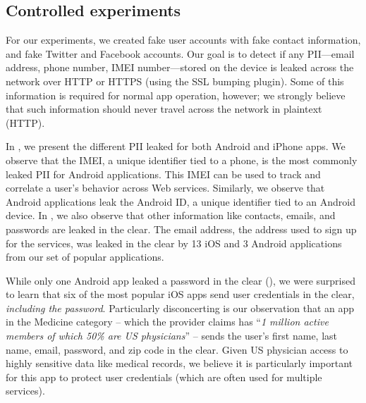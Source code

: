 \subsection{Controlled experiments}

For our experiments, we created fake user accounts with fake contact
information, and fake Twitter and Facebook accounts.  Our goal is to
detect if any PII---email
address, phone number, IMEI number---stored on the device is leaked
across the network over HTTP or HTTPS (using the SSL bumping plugin).
Some of this information is required for normal app operation, however; we strongly believe that such information should
never travel across the network in plaintext (HTTP). 

In , we present the different PII leaked for both Android and iPhone apps.  We observe that
the IMEI, a unique identifier tied to a phone, is the most commonly
leaked PII for Android applications.  This IMEI can be used to track
and correlate a user's behavior across Web services.  Similarly, we
observe that Android applications leak the Android ID, a unique
identifier tied to an Android device.  In , we also
observe that other information like contacts, emails, and passwords
are leaked in the clear.  The email address, the address used to sign
up for the services, was leaked in the clear by 13 iOS and 3 Android
applications from our set of popular applications.

While only one Android app leaked a password in the clear (), 
we were surprised to learn that six of the most popular iOS apps send user 
credentials in the clear, \emph{including the password}. Particularly disconcerting 
is our observation that an app in the Medicine category -- which the provider claims has ``\emph{1 million active members 
of which 50\% are US physicians}'' -- sends the user's first name, last name, 
email, password, and zip code in the clear. Given US physician access to highly sensitive 
data like medical records, we believe it is particularly important for this app to protect 
user credentials (which are often used for multiple services). 


